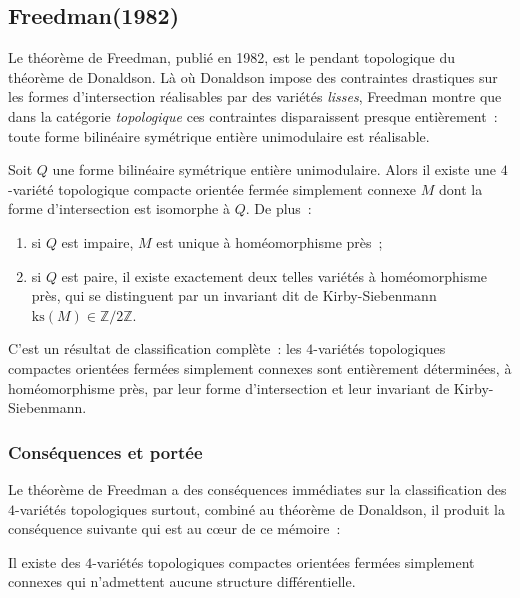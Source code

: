 
\subsection{Freedman(1982)}


Le théorème de Freedman, publié en 1982, est le pendant topologique du théorème de Donaldson.
Là où Donaldson impose des contraintes drastiques sur les formes d'intersection réalisables
par des variétés \emph{lisses}, Freedman montre que dans la catégorie \emph{topologique} ces
contraintes disparaissent presque entièrement~: toute forme bilinéaire symétrique entière
unimodulaire est réalisable.

\begin{theorem}[Freedman, 1982]\label{thm:freedman}
  Soit $Q$ une forme bilinéaire symétrique entière unimodulaire. Alors il existe une
  $4$-variété topologique compacte orientée fermée simplement connexe $M$ dont la forme
  d'intersection est isomorphe à $Q$. De plus~:
  \begin{enumerate}
    \item si $Q$ est impaire, $M$ est unique à homéomorphisme près~;
    \item si $Q$ est paire, il existe exactement deux telles variétés à homéomorphisme près,
          qui se distinguent par un invariant dit de Kirby-Siebenmann
          $\mathrm{ks}(M) \in \mathbb{Z}/2\mathbb{Z}$.
  \end{enumerate}
\end{theorem}

C'est un résultat de classification complète~: les $4$-variétés topologiques compactes
orientées fermées simplement connexes sont entièrement déterminées, à homéomorphisme près,
par leur forme d'intersection et leur invariant de Kirby-Siebenmann.


\subsubsection*{Conséquences et portée}

Le théorème de Freedman a des conséquences immédiates sur la classification des $4$-variétés
topologiques surtout, combiné au théorème de Donaldson, il produit la conséquence suivante qui est au
c\oe ur de ce mémoire~:

\begin{corollary}\label{cor:freedman_donaldson}
  Il existe des $4$-variétés topologiques compactes orientées fermées simplement connexes qui
  n'admettent aucune structure différentielle.
\end{corollary}

